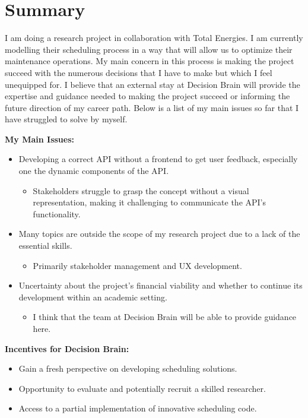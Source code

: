 \section{Summary}
I am doing a research project in collaboration with Total Energies. I am currently modelling 
their scheduling process in a way that will allow us to optimize their maintenance operations. My main concern
in this process is making the project succeed with the numerous decisions that I have to make but 
which I feel unequipped for. I believe that an external stay at Decision Brain will provide the 
expertise and guidance needed to making the project succeed or informing the future direction of my career path. 
Below is a list of my main issues so far that I have struggled to solve by myself. 

\textbf{My Main Issues:}
\begin{itemize}
	\item Developing a correct API without a frontend to get user feedback, especially one the dynamic components of the API.
	\begin{itemize}
		\item Stakeholders struggle to grasp the concept without a visual representation, making it challenging to communicate the API's functionality.
	\end{itemize}
	\item Many topics are outside the scope of my research project due to a lack of the essential skills. 
	\begin{itemize}
		\item Primarily stakeholder management and UX development.
	\end{itemize}
	\item Uncertainty about the project's financial viability and whether to continue its development within an academic setting.
	\begin{itemize}
		\item I think that the team at Decision Brain will be able to provide guidance here.
	\end{itemize}
\end{itemize}

\textbf{Incentives for Decision Brain:} 
\begin{itemize} 
	\item Gain a fresh perspective on developing scheduling solutions. 
	\item Opportunity to evaluate and potentially recruit a skilled researcher. 
	\item Access to a partial implementation of innovative scheduling code.
\end{itemize}

